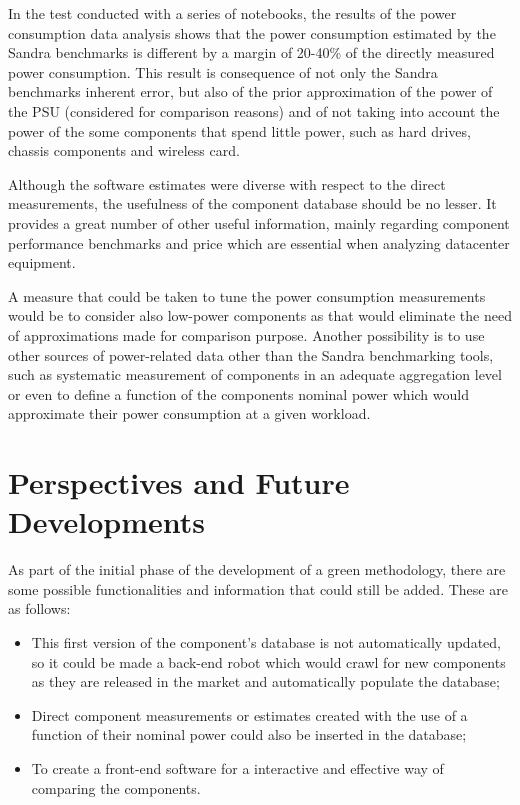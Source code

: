     In the test conducted with a series of notebooks, the results of the power consumption data analysis shows that the power consumption estimated by the Sandra benchmarks is different by a margin of 20-40\% of the directly measured power consumption. This result is consequence of not only the Sandra benchmarks inherent error, but also of the prior approximation of the power of the PSU (considered for comparison reasons) and of not taking into account the power of the some components that spend little power, such as hard drives, chassis components and wireless card.
    
    Although the software estimates were diverse with respect to the direct measurements, the usefulness of the component database should be no lesser. It provides a great number of other useful information, mainly regarding component performance benchmarks and price which are essential when analyzing datacenter equipment.
    
    A measure that could be taken to tune the power consumption measurements would be to consider also low-power components as that would eliminate the need of approximations made for comparison purpose. Another possibility is to use other sources of power-related data other than the Sandra benchmarking tools, such as systematic measurement of components in an adequate aggregation level or even to define a function of the components nominal power which would approximate their power consumption at a given workload. 
    
    \pagebreak
    \section{Perspectives and Future Developments}

        As part of the initial phase of the development of a green methodology, there are some possible functionalities and information that could still be added. These are as follows:
    \begin{itemize}
	    \item This first version of the component's database is not automatically updated, so it could be made a back-end robot which would crawl for new components as they are released in the market and automatically populate the database;
	    \item Direct component measurements or estimates created with the use of a function of their nominal power could also be inserted in the database;
	    \item To create a front-end software for a interactive and effective way of comparing the components.
    \end{itemize}







